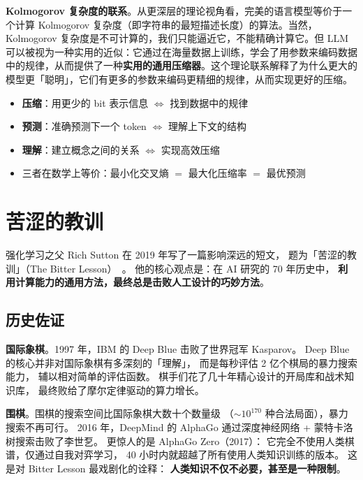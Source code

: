 \textbf{Kolmogorov 复杂度的联系}。从更深层的理论视角看，完美的语言模型等价于一个计算 Kolmogorov 复杂度（即字符串的最短描述长度）的算法。当然，Kolmogorov 复杂度是不可计算的，我们只能逼近它，不能精确计算它。但 LLM 可以被视为一种实用的近似：它通过在海量数据上训练，学会了用参数来编码数据中的规律，从而提供了一种\textbf{实用的通用压缩器}。这个理论联系解释了为什么更大的模型更「聪明」，它们有更多的参数来编码更精细的规律，从而实现更好的压缩。

\begin{keybox}[压缩--预测--理解 三位一体]
\begin{itemize}[noitemsep]
  \item \textbf{压缩}：用更少的 bit 表示信息 $\Leftrightarrow$ 找到数据中的规律
  \item \textbf{预测}：准确预测下一个 token $\Leftrightarrow$ 理解上下文的结构
  \item \textbf{理解}：建立概念之间的关系 $\Leftrightarrow$ 实现高效压缩
  \item 三者在数学上等价：最小化交叉熵 $=$ 最大化压缩率 $=$ 最优预测
\end{itemize}
\end{keybox}

\section{苦涩的教训}

强化学习之父 Rich Sutton 在 2019 年写了一篇影响深远的短文，
题为「苦涩的教训」（The Bitter Lesson）~\cite{sutton2019bitterlesson}。
他的核心观点是：在 AI 研究的 70 年历史中，
\textbf{利用计算能力的通用方法，最终总是击败人工设计的巧妙方法}。

\subsection{历史佐证}

\textbf{国际象棋}。1997 年，IBM 的 Deep Blue 击败了世界冠军 Kasparov。
Deep Blue 的核心并非对国际象棋有多深刻的「理解」，
而是每秒评估 2 亿个棋局的暴力搜索能力，
辅以相对简单的评估函数。
棋手们花了几十年精心设计的开局库和战术知识库，
最终败给了摩尔定律驱动的算力增长。

\textbf{围棋}。围棋的搜索空间比国际象棋大数十个数量级
（$\sim 10^{170}$ 种合法局面），暴力搜索不再可行。
2016 年，DeepMind 的 AlphaGo 通过深度神经网络 + 蒙特卡洛树搜索击败了李世乭。
更惊人的是 AlphaGo Zero（2017）：
它完全不使用人类棋谱，仅通过自我对弈学习，
40 小时内就超越了所有使用人类知识训练的版本。
这是对 Bitter Lesson 最戏剧化的诠释：
\textbf{人类知识不仅不必要，甚至是一种限制}。

